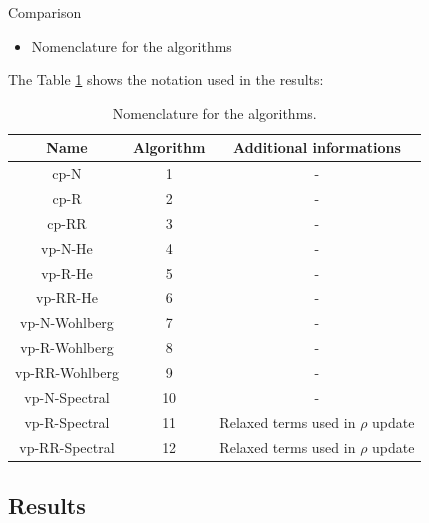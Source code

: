 \documentclass[8pt,red]{beamer}
\theoremstyle{plain}
\theoremstyle{definition}
\theoremstyle{remark}
\begin{document}
\begin{frame}{Comparison}
\begin{itemize}
\item Nomenclature for the algorithms
\end{itemize}

The Table \ref{Table:1} shows the notation used in the results:

\begin{table}[h!]
\centering
 \begin{tabular}{||c c c||} 
 \hline
 Name & Algorithm & Additional informations \\ [0.5ex] 
 \hline\hline
 cp-N & 1 & - \\ 
 \hline
 cp-R & 2 & - \\
 \hline
 cp-RR & 3 & - \\
 \hline
 vp-N-He & 4 & - \\
 \hline
 vp-R-He & 5 & - \\
 \hline
 vp-RR-He & 6 & - \\
 \hline
 vp-N-Wohlberg & 7 & - \\
 \hline
 vp-R-Wohlberg & 8 & - \\
 \hline
 vp-RR-Wohlberg & 9 & - \\
 \hline
 vp-N-Spectral & 10 & - \\
 \hline
 vp-R-Spectral & 11 & Relaxed terms used in $\rho$ update \\
 \hline
 vp-RR-Spectral & 12 & Relaxed terms used in $\rho$ update \\ [1ex] 
 \hline
\end{tabular}
\caption{Nomenclature for the algorithms.}
\label{Table:1}
\end{table}
\end{frame}

\subsection{Results}
\end{document}
